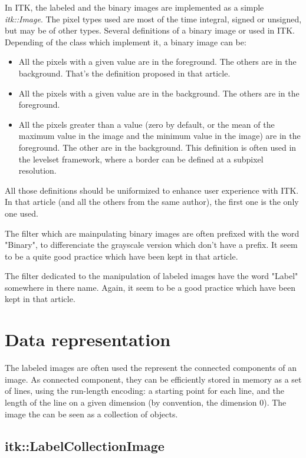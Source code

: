 \documentclass{InsightArticle}
\begin{document}
In ITK, the labeled and the binary images are implemented as a simple {\em
itk::Image}. The pixel types used are most of the time integral, signed or
unsigned, but may be of other types.
Several definitions of a binary image or used in ITK. Depending of the class
which implement it, a binary image can be:
\begin{itemize}
  \item All the pixels with a given value are in the foreground. The others are
in the background. That's the definition proposed in that article.
  \item All the pixels with a given value are in the background. The others are
in the foreground.
  \item All the pixels greater than a value (zero by default, or the mean of the maximum value in the image
and the minimum value in the image) are in the foreground. The other are in the
background. This definition is often used in the levelset framework, where a border
can be defined at a subpixel resolution.
\end{itemize}
All those definitions should be uniformized to enhance user experience with ITK.
In that article (and all the others from the same author), the first one is the
only one used.

The filter which are mainpulating binary images are often prefixed with the word
"Binary", to differenciate the grayscale version which don't have a prefix. It
seem to be a quite good practice which have been kept in that article.

The filter dedicated to the manipulation of labeled images have the word "Label"
somewhere in there name. Again, it seem to be a good practice which have been
kept in that article.


\section{Data representation}

The labeled images are often used the represent the connected components of an
image. As connected component, they can be efficiently stored in memory as a set
of lines, using the run-length encoding: a starting point for each line, and the
length of the line on a given dimension (by convention, the dimension 0). The
image the can be seen as a collection of objects.

\subsection{itk::LabelCollectionImage}
\end{document}
